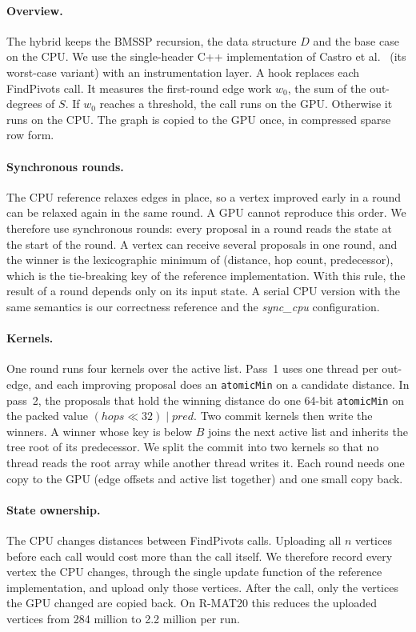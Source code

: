 \documentclass[conference]{IEEEtran}
\begin{document}
\paragraph{Overview.} The hybrid keeps the BMSSP recursion, the data structure $D$ and the base case on the CPU. We use
the single-header C++ implementation of Castro et al.~\cite{castro2025} (its worst-case variant) with an
instrumentation layer. A hook replaces each FindPivots call. It measures the first-round edge work $w_0$, the sum of the
out-degrees of $S$. If $w_0$ reaches a threshold, the call runs on the GPU. Otherwise it runs on the CPU. The graph is
copied to the GPU once, in compressed sparse row form.

\paragraph{Synchronous rounds.} The CPU reference relaxes edges in place, so a vertex improved early in a round can be
relaxed again in the same round. A GPU cannot reproduce this order. We therefore use synchronous rounds: every
proposal in a round reads the state at the start of the round. A vertex can receive several proposals in one round,
and the winner is the lexicographic minimum of (distance, hop count, predecessor), which is the tie-breaking key of the
reference implementation. With this rule, the result of a round depends only on its input state. A serial CPU version
with the same semantics is our correctness reference and the \emph{sync\_cpu} configuration.

\paragraph{Kernels.} One round runs four kernels over the active list. Pass~1 uses one thread per out-edge, and each
improving proposal does an \texttt{atomicMin} on a candidate distance. In pass~2, the proposals that hold the winning
distance do one 64-bit \texttt{atomicMin} on the packed value $(\mathit{hops} \ll 32) \mid \mathit{pred}$. Two commit
kernels then write the winners. A winner whose key is below $B$ joins the next active list and inherits the tree root
of its predecessor. We split the commit into two kernels so that no thread reads the root array while another thread
writes it. Each round needs one copy to the GPU (edge offsets and active list together) and one small copy back.

\paragraph{State ownership.} The CPU changes distances between FindPivots calls. Uploading all $n$ vertices before each
call would cost more than the call itself. We therefore record every vertex the CPU changes, through the single update
function of the reference implementation, and upload only those vertices. After the call, only the vertices the GPU
changed are copied back. On R-MAT20 this reduces the uploaded vertices from 284 million to 2.2 million per run.
\end{document}
